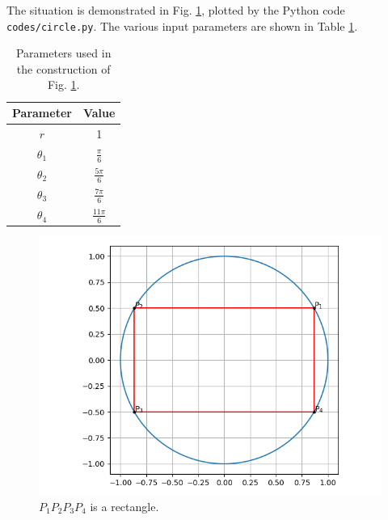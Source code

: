 \documentclass[journal,12pt,twocolumn]{IEEEtran}
\begin{document}
\begin{enumerate}
    The situation is demonstrated in Fig. \ref{fig:circle}, plotted by the Python
    code \texttt{codes/circle.py}. The various input parameters are shown in Table
    \ref{tab:param}.
    \begin{table}[!ht]
        \centering
        \begin{tabular}{|c|c|}
            \hline
            \textbf{Parameter} & \textbf{Value} \\
            \hline
            $r$ & 1 \\
            \hline
            $\theta_1$ & $\frac{\pi}{6}$ \\
            \hline
            $\theta_2$ & $\frac{5\pi}{6}$ \\
            \hline
            $\theta_3$ & $\frac{7\pi}{6}$ \\
            \hline
            $\theta_4$ & $\frac{11\pi}{6}$ \\
            \hline
        \end{tabular}
        \caption{Parameters used in the construction of Fig. \ref{fig:circle}.}
        \label{tab:param}
    \end{table}
    
    \begin{figure}[!ht]
        \centering
        \includegraphics[width=\columnwidth]{figs/circle.png}
        \caption{$P_1P_2P_3P_4$ is a rectangle.}
        \label{fig:circle}
    \end{figure}
\end{enumerate}
\end{document}
